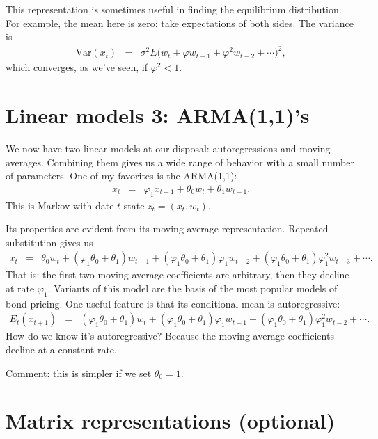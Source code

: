 \documentclass[11pt]{article}
\begin{document}
This representation is sometimes useful in finding the equilibrium distribution.
For example, the mean here is zero:  take expectations of both sides.
The variance is
\begin{eqnarray*}
    \mbox{Var} (x_{t})
            &=& \sigma^2 E  \big( w_t + \varphi w_{t-1} + \varphi^2 w_{t-2}
                + \cdots \big)^2 , %
\end{eqnarray*}
which converges, as we've seen, if $\varphi^2 < 1$.


\section{Linear models 3:  ARMA(1,1)'s}


We now have two linear models at our disposal:  autoregressions and moving averages.
Combining them gives us a wide range of behavior with a small number
of parameters.
One of my favorites is the ARMA(1,1):
\begin{eqnarray*}
    x_t &=& \varphi_1 x_{t-1} + \theta_0 w_t + \theta_1 w_{t-1} .
\end{eqnarray*}
This is Markov with date $t$ state $z_{t} = (x_t,w_t)$.

Its properties are evident from its moving average representation.
Repeated substitution gives us
\begin{eqnarray*}
    x_t &=&  \theta_0 w_t + (\varphi_1\theta_0+ \theta_1) w_{t-1}
                + (\varphi_1\theta_0+ \theta_1)\varphi_1 w_{t-2}
                +  (\varphi_1\theta_0+ \theta_1)\varphi_1^2 w_{t-3} + \cdots .
\end{eqnarray*}
That is:  the first two moving average coefficients are arbitrary,
then they decline at rate $\varphi_1$.
Variants of this model are the basis of the most popular models of bond pricing.
One useful feature is that its conditional mean is autoregressive:
\begin{eqnarray*}
  E_t ( x_{t+1} ) &=&  (\varphi_1\theta_0+ \theta_1) w_{t}
                + (\varphi_1\theta_0+ \theta_1)\varphi_1 w_{t-1}
                +  (\varphi_1\theta_0+ \theta_1)\varphi_1^2 w_{t-2} + \cdots .
\end{eqnarray*}
How do we know it's autoregressive?
Because the moving average coefficients decline at a constant rate.

Comment:  this is simpler if we set $\theta_0 = 1$.

\section{Matrix representations (optional)}
\label{sec:matrix}
\end{document}

